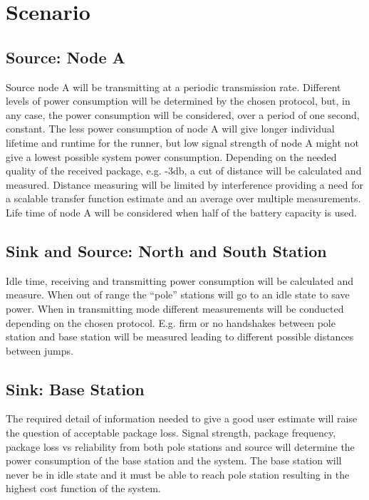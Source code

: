\section{Scenario}\label{introduction:scenario}

\subsection{Source: Node A}
Source node A will be transmitting at a periodic transmission rate. Different levels of power consumption will be determined by the chosen protocol, but, in any case, the power consumption will be considered, over a period of one second, constant. The less power consumption of node A will give longer individual lifetime and runtime for the runner, but low signal strength of node A might not give a lowest possible system power consumption. Depending on the needed quality of the received package, e.g. -3db, a cut of distance will be calculated and measured. Distance measuring will be limited by interference providing a need for a scalable transfer function estimate and an average over multiple measurements. Life time of node A will be considered when half of the battery capacity is used.

\subsection{Sink and Source: North and South Station}
Idle time, receiving and transmitting power consumption will be calculated and measure. When out of range the “pole” stations will go to an idle state to save power. When in transmitting mode different measurements will be conducted depending on the chosen protocol. E.g. firm or no handshakes between pole station and base station will be measured leading to different possible distances between jumps.

\subsection{Sink: Base Station}
The required detail of information needed to give a good user estimate will raise the question of acceptable package loss. Signal strength, package frequency, package loss vs reliability from both pole stations and source will determine the power consumption of the base station and the system. The base station will never be in idle state and it must be able to reach pole station resulting in the highest cost function of the system. 

